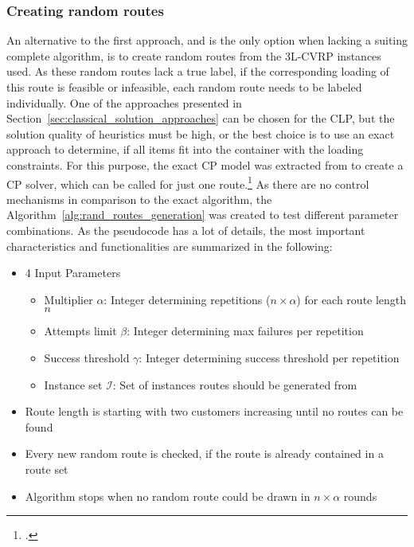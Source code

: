 \subsubsection{Creating random routes}
An alternative to the first approach, and is the only option when lacking a suiting complete algorithm, is to
create random routes from the \gls{3L-CVRP} instances used. As these random routes lack
a true label, if the corresponding loading of this route is feasible or infeasible, each random
route needs to be labeled individually. One of the approaches presented in Section~\ref{sec:classical_solution_approaches} can be chosen
for the \gls{CLP}, but the solution quality of heuristics must be high, or the best choice is to
use an exact approach to determine, if all items fit into the container with the loading constraints.
For this purpose, the exact \gls{CP} model was extracted from \cite{tamke_repository_2024} to create
a \gls{CP} solver, which can be called for just one route.\footcite[Stolen with permission from][]{tamke_repository_2024}
As there are no control mechanisms in comparison to the exact algorithm, the Algorithm~\ref{alg:rand_routes_generation} was created to test different parameter
combinations. As the pseudocode has a lot of details, the most important characteristics and
functionalities are summarized in the following:

\begin{itemize}
    \item 4 Input Parameters
          \begin{itemize}
              \item Multiplier $\alpha$: Integer determining repetitions ($n\times\alpha$) for each route length $n$
              \item  Attempts limit $\beta$: Integer determining max failures per repetition
              \item  Success threshold $\gamma$: Integer determining success threshold per repetition
              \item Instance set $\mathcal{I}$: Set of instances routes should be generated from
          \end{itemize}
    \item Route length is starting with two customers increasing until no routes can be found
    \item Every new random route is checked, if the route is already contained in a route set
    \item Algorithm stops when no random route could be drawn in $n \times \alpha$ rounds
\end{itemize}

